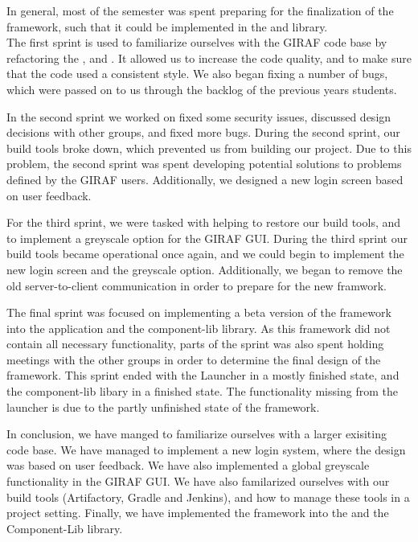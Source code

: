 In general, most of the semester was spent preparing for the finalization of the
 framework, such that it could be implemented in the  and
 library.\\
The first sprint is used to familiarize ourselves with the GIRAF code base by
refactoring the ,  and
. It allowed us to increase the code quality, and to
make sure that the code used a consistent style. We also began fixing a number
of bugs, which were passed on to us through the backlog of the previous years
students.\nl



In the second sprint we worked on fixed some security issues, discussed design
decisions with other groups, and fixed more bugs. During the second sprint, our
build tools broke down, which prevented us from building our project. Due to
this problem, the second sprint was spent developing potential solutions to
problems defined by the GIRAF users. Additionally, we designed a new login
screen based on user feedback.\nl

For the third sprint, we were tasked with helping to restore our build tools,
and to implement a greyscale option for the GIRAF GUI. During the third sprint our build
tools became operational once again, and we could begin to implement the new
login screen and the greyscale option. Additionally, we began to remove the old
server-to-client communication in order to prepare for the new  framwork.\nl

The final sprint was focused on implementing a beta version of the 
framework into the  application and the component-lib library.
As this framework did not contain all necessary functionality, parts of the sprint was
also spent holding meetings with the other groups in order to determine the
final design of the  framework. This sprint ended with the Launcher in a
mostly finished state, and the component-lib libary in a finished state. The
functionality missing from the launcher is due to the partly unfinished state of
the  framework.\nl

In conclusion, we have manged to familiarize ourselves with a larger exisiting
code base. We have managed to implement a new login system, where the
design was based on user feedback. We have also implemented a global greyscale
functionality in the GIRAF GUI. We have also familarized ourselves with
our build tools (Artifactory, Gradle and Jenkins), and how to manage
these tools in a project setting. Finally, we have implemented the 
framework into the  and the {Component-Lib} library.
